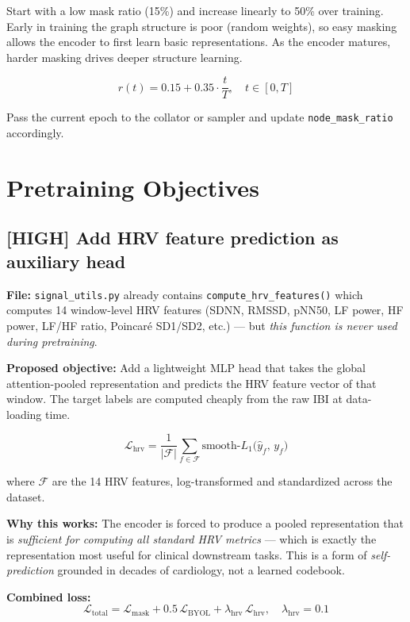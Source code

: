 \documentclass[11pt,a4paper]{article}
\newcommand{\high}[1]{\textcolor{impacthigh}{\textbf{[HIGH]} #1}}
\newcommand{\file}[1]{\texttt{#1}}
\begin{document}
Start with a low mask ratio (15\%) and increase linearly to 50\% over training.
Early in training the graph structure is poor (random weights),
so easy masking allows the encoder to first learn basic representations.
As the encoder matures, harder masking drives deeper structure learning.

\[
    r(t) = 0.15 + 0.35 \cdot \frac{t}{T}, \quad t \in [0, T]
\]

Pass the current epoch to the collator or sampler and update \texttt{node\_mask\_ratio} accordingly.

\section{Pretraining Objectives}

\subsection{\high{Add HRV feature prediction as auxiliary head}}

\textbf{File:} \file{signal\_utils.py} already contains \texttt{compute\_hrv\_features()}
which computes 14 window-level HRV features (SDNN, RMSSD, pNN50, LF power, HF power,
LF/HF ratio, Poincaré SD1/SD2, etc.) --- but \emph{this function is never used
during pretraining}.

\textbf{Proposed objective:}
Add a lightweight MLP head that takes the global attention-pooled representation
and predicts the HRV feature vector of that window.
The target labels are computed cheaply from the raw IBI at data-loading time.

\[
    \mathcal{L}_{\text{hrv}} = \frac{1}{|\mathcal{F}|} \sum_{f \in \mathcal{F}}
    \mathrm{smooth}\text{-}L_1\bigl(\hat{y}_f,\, y_f\bigr)
\]

where $\mathcal{F}$ are the 14 HRV features, log-transformed and standardized
across the dataset.

\textbf{Why this works:}
The encoder is forced to produce a pooled representation that is
\emph{sufficient for computing all standard HRV metrics} --- which is exactly
the representation most useful for clinical downstream tasks.
This is a form of \emph{self-prediction} grounded in decades of cardiology,
not a learned codebook.

\textbf{Combined loss:}
\[
    \mathcal{L}_{\text{total}} = \mathcal{L}_{\text{mask}} + 0.5\,\mathcal{L}_{\text{BYOL}}
    + \lambda_{\text{hrv}}\,\mathcal{L}_{\text{hrv}}, \quad \lambda_{\text{hrv}} = 0.1
\]
\end{document}
